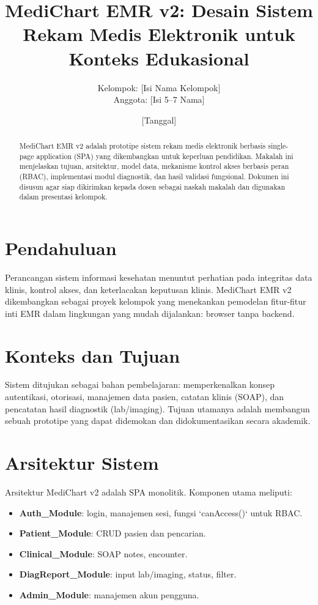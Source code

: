 \documentclass[12pt,a4paper]{article}
\title{MediChart EMR v2: Desain Sistem Rekam Medis Elektronik untuk Konteks Edukasional}
\author{Kelompok: [Isi Nama Kelompok] \\ Anggota: [Isi 5--7 Nama]}
\date{[Tanggal]}
\begin{document}
\maketitle

\begin{abstract}
MediChart EMR v2 adalah prototipe sistem rekam medis elektronik berbasis single-page application (SPA) yang dikembangkan untuk keperluan pendidikan. Makalah ini menjelaskan tujuan, arsitektur, model data, mekanisme kontrol akses berbasis peran (RBAC), implementasi modul diagnostik, dan hasil validasi fungsional. Dokumen ini disusun agar siap dikirimkan kepada dosen sebagai naskah makalah dan digunakan dalam presentasi kelompok.
\end{abstract}

\section{Pendahuluan}
Perancangan sistem informasi kesehatan menuntut perhatian pada integritas data klinis, kontrol akses, dan keterlacakan keputusan klinis. MediChart EMR v2 dikembangkan sebagai proyek kelompok yang menekankan pemodelan fitur-fitur inti EMR dalam lingkungan yang mudah dijalankan: browser tanpa backend.

\section{Konteks dan Tujuan}
Sistem ditujukan sebagai bahan pembelajaran: memperkenalkan konsep autentikasi, otorisasi, manajemen data pasien, catatan klinis (SOAP), dan pencatatan hasil diagnostik (lab/imaging). Tujuan utamanya adalah membangun sebuah prototipe yang dapat didemokan dan didokumentasikan secara akademik.

\section{Arsitektur Sistem}
Arsitektur MediChart v2 adalah SPA monolitik. Komponen utama meliputi:
\begin{itemize}
  \item \textbf{Auth\_Module}: login, manajemen sesi, fungsi `canAccess()` untuk RBAC.
  \item \textbf{Patient\_Module}: CRUD pasien dan pencarian.
  \item \textbf{Clinical\_Module}: SOAP notes, encounter.
  \item \textbf{DiagReport\_Module}: input lab/imaging, status, filter.
  \item \textbf{Admin\_Module}: manajemen akun pengguna.
\end{itemize}
\end{document}
